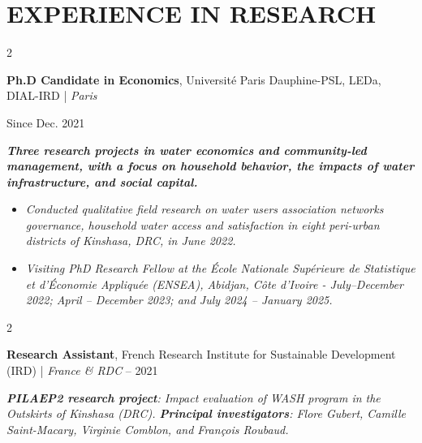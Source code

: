 \documentclass[10 pt, letterpaper]{article}
\newenvironment{highlights}{
    \begin{itemize}[
        topsep=0.10 cm,
        parsep=0.10 cm,
        partopsep=0pt,
        itemsep=0pt,
        leftmargin=0 cm + 10pt
    ]
}{
    \end{itemize}
} %
\newenvironment{twocolentry}[2][]{
    \onecolentry
    \def\secondColumn{#2}
    \setcolumnwidth{\fill, 4.5 cm}
    \begin{paracol}{2}
}{
    \switchcolumn \raggedleft \secondColumn
    \end{paracol}
    \endonecolentry
} %
\begin{document}
    \section{EXPERIENCE IN RESEARCH}

        \begin{twocolentry}{
            Since Dec. 2021
        }
            \textbf{Ph.D Candidate in Economics}, Université Paris Dauphine-PSL, LEDa, DIAL-IRD | \textit{Paris}
            \end{twocolentry}
            \vspace{0.10 cm}
            \textbf{\textit{Three research projects in water economics and community-led management, with a focus on household behavior, the impacts of water infrastructure, and social capital.}}

            \begin{highlights}
                \item \textit{Conducted qualitative field research on water users association networks governance, household water access and satisfaction in eight peri-urban districts of Kinshasa, DRC, in June 2022.}
                \item \textit{Visiting PhD Research Fellow at the École Nationale Supérieure de Statistique et d'Économie Appliquée (ENSEA), Abidjan, Côte d’Ivoire - July–December 2022; April – December 2023; and July 2024 – January 2025.}
            \end{highlights}
            
        \vspace{0.25 cm}
        \begin{twocolentry}{
            2020 – 2021
        }
            \textbf{Research Assistant}, French Research Institute for Sustainable Development (IRD) | \textit{France \& RDC} \end{twocolentry}
            \vspace{0.10 cm}
            \textit{\textbf{PILAEP2 research project}: Impact evaluation of WASH program in the Outskirts of Kinshasa (DRC). \textbf{Principal investigators}: Flore Gubert, Camille Saint-Macary, Virginie Comblon, and François Roubaud.}
            \vspace{0.10 cm}
            
\end{document}
